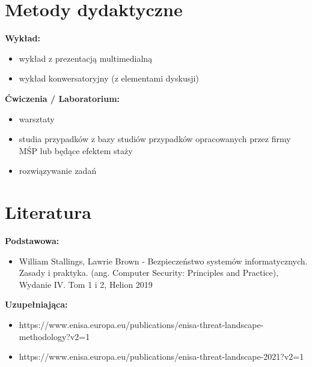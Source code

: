 \documentclass[12pt, a4paper]{article}
\begin{document}
\section{Metody dydaktyczne}

\textbf{Wykład:}
\begin{itemize}
  \item wykład z prezentacją multimedialną
  \item wykład konwersatoryjny (z elementami dyskusji)
\end{itemize}
\vspace{4pt}
\textbf{Ćwiczenia / Laboratorium:}
\begin{itemize}
  \item warsztaty
  \item studia przypadków z bazy studiów przypadków opracowanych przez firmy MŚP lub będące efektem staży
  \item rozwiązywanie zadań
\end{itemize}
\vspace{4pt}


\section{Literatura}

\textbf{Podstawowa:}
\begin{itemize}
  \item William Stallings, Lawrie Brown - Bezpieczeństwo systemów informatycznych. Zasady i praktyka. (ang. Computer Security: Principles and Practice), Wydanie IV. Tom 1 i 2, Helion 2019
\end{itemize}

\textbf{Uzupełniająca:}
\begin{itemize}
  \item https://www.enisa.europa.eu/publications/enisa-threat-landscape-methodology?v2=1
  \item https://www.enisa.europa.eu/publications/enisa-threat-landscape-2021?v2=1
\end{itemize}
\end{document}
